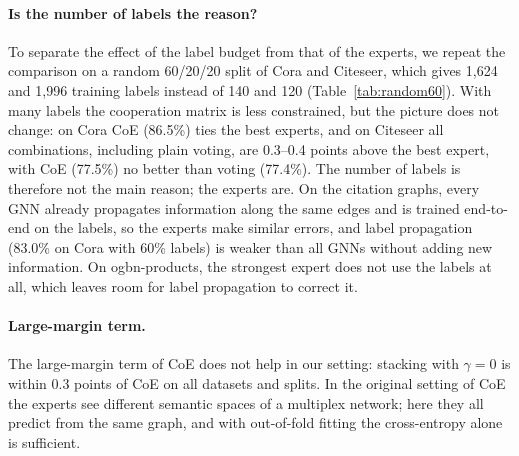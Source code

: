 \documentclass[sigconf,nonacm]{acmart}
\begin{document}
\paragraph{Is the number of labels the reason?}
To separate the effect of the label budget from that of the experts, we repeat the comparison on a random 60/20/20 split of Cora and Citeseer, which gives 1{,}624 and 1{,}996 training labels instead of 140 and 120 (Table~\ref{tab:random60}).
With many labels the cooperation matrix is less constrained, but the picture does not change: on Cora CoE (86.5\%) ties the best experts, and on Citeseer all combinations, including plain voting, are 0.3--0.4 points above the best expert, with CoE (77.5\%) no better than voting (77.4\%).
The number of labels is therefore not the main reason; the experts are.
On the citation graphs, every GNN already propagates information along the same edges and is trained end-to-end on the labels, so the experts make similar errors, and label propagation (83.0\% on Cora with 60\% labels) is weaker than all GNNs without adding new information.
On ogbn-products, the strongest expert does not use the labels at all, which leaves room for label propagation to correct it.

\begin{table}[t]
\caption{CoE on Cora and Citeseer with a random 60/20/20 split (10 seeds, no self-training).}
\label{tab:random60}

\end{table}

\paragraph{Large-margin term.}
The large-margin term of CoE does not help in our setting: stacking with $\gamma=0$ is within 0.3 points of CoE on all datasets and splits.
In the original setting of CoE the experts see different semantic spaces of a multiplex network; here they all predict from the same graph, and with out-of-fold fitting the cross-entropy alone is sufficient.
\end{document}
